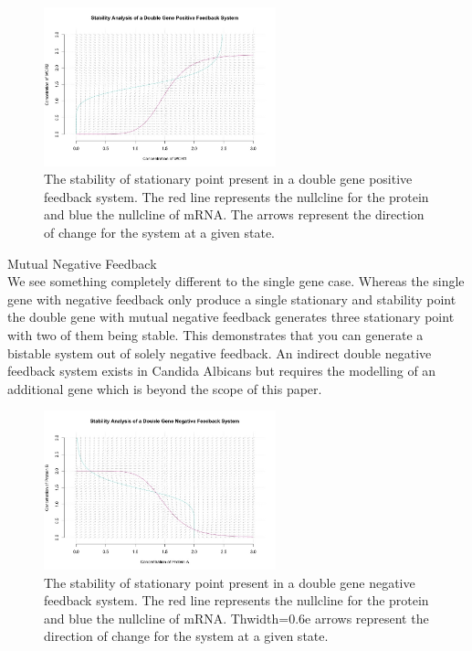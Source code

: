 \documentclass[]{article}
\begin{document}
            \begin{figure}[h!]
            \centering
            \includegraphics[width=0.6\textwidth]{./figures/stabilityDoublePositive.jpeg}
            \caption{The stability of stationary point present in a double gene positive feedback system. The red line represents the nullcline for the protein and blue the nullcline of mRNA. The arrows represent the direction of change for the system at a given state.}
            \label{stabilityDoublePositive}
            \end{figure}
Mutual Negative Feedback\\
We see something completely different to the single gene case. Whereas the single gene with negative feedback only produce a single stationary and stability point the double gene with mutual negative feedback generates three stationary point with two of them being stable. This demonstrates that you can generate a bistable system out of solely negative feedback. An indirect double negative feedback system exists in Candida Albicans but requires the modelling of an additional gene which is beyond the scope of this paper.         
            \begin{figure}[h!]
            \centering
            \includegraphics[width=0.6\textwidth]{./figures/stabilityDoubleNegative.jpeg}
            \caption{The stability of stationary point present in a double gene negative feedback system. The red line represents the nullcline for the protein and blue the nullcline of mRNA. Thwidth=0.6e arrows represent the direction of change for the system at a given state.}
            \label{stabilityDoubleNegative}
            \end{figure}
\\
\end{document}
